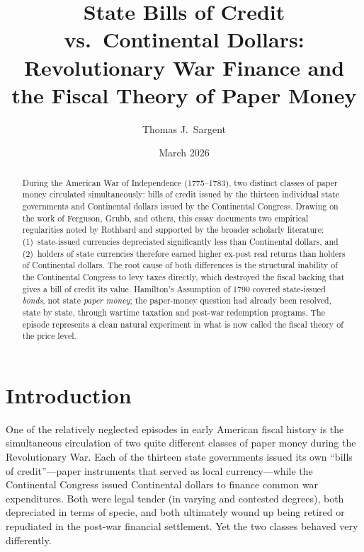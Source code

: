 \documentclass[12pt]{article}
\title{\textbf{State Bills of Credit vs.\ Continental Dollars:\\
Revolutionary War Finance and the Fiscal Theory of Paper Money}}
\author{Thomas J.\ Sargent}
\date{March 2026}
\begin{document}
\maketitle

\begin{abstract}
\noindent
During the American War of Independence (1775--1783), two distinct classes of
paper money circulated simultaneously: bills of credit issued by the thirteen
individual state governments and Continental dollars issued by the Continental
Congress.  Drawing on the work of Ferguson, Grubb, and others, this essay
documents two empirical regularities noted by Rothbard and supported by the
broader scholarly literature: (1)~state-issued currencies depreciated
significantly less than Continental dollars, and (2)~holders of state
currencies therefore earned higher ex-post real returns than holders of
Continental dollars.  The root cause of both differences is the structural
inability of the Continental Congress to levy taxes directly, which destroyed
the fiscal backing that gives a bill of credit its value.  Hamilton's Assumption
of 1790 covered state-issued \emph{bonds}, not state \emph{paper money};
the paper-money question had already been resolved, state by state, through
wartime taxation and post-war redemption programs.  The episode represents a
clean natural experiment in what is now called the fiscal theory of the price
level.
\end{abstract}

\tableofcontents

\newpage

\section{Introduction}

One of the relatively neglected episodes in early American fiscal history is
the simultaneous circulation of two quite different classes of paper money
during the Revolutionary War.  Each of the thirteen state governments
issued its own ``bills of credit''---paper instruments that served as local
currency---while the Continental Congress issued Continental dollars to
finance common war expenditures.  Both were legal tender (in varying and
contested degrees), both depreciated in terms of specie, and both ultimately
wound up being retired or repudiated in the post-war financial settlement.  Yet
the two classes behaved very differently.
\end{document}
